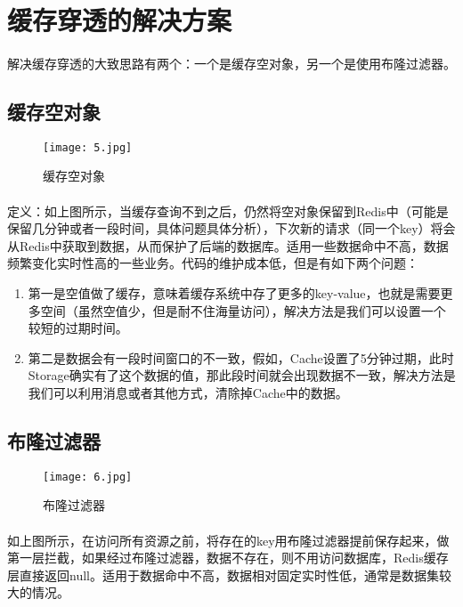 \documentclass[lang=cn,11pt,a4paper,cite=numbers]{elegantpaper}
\begin{document}
\section{缓存穿透的解决方案}
\paragraph{}解决缓存穿透的大致思路有两个：一个是缓存空对象，另一个是使用布隆过滤器。
\subsection{缓存空对象}
\begin{figure}[!htb]
    \centering
    \texttt{[image: 5.jpg]}
    \caption{缓存空对象}
\end{figure}
\paragraph{}定义：如上图所示，当缓存查询不到之后，仍然将空对象保留到Redis中（可能是保留几分钟或者一段时间，具体问题具体分析），下次新的请求（同一个key）将会从Redis中获取到数据，从而保护了后端的数据库。适用一些数据命中不高，数据频繁变化实时性高的一些业务。代码的维护成本低，但是有如下两个问题：
\begin{enumerate}
    \item 第一是空值做了缓存，意味着缓存系统中存了更多的key-value，也就是需要更多空间（虽然空值少，但是耐不住海量访问），解决方法是我们可以设置一个较短的过期时间。
    \item 第二是数据会有一段时间窗口的不一致，假如，Cache设置了5分钟过期，此时Storage确实有了这个数据的值，那此段时间就会出现数据不一致，解决方法是我们可以利用消息或者其他方式，清除掉Cache中的数据。
  \end{enumerate}
\subsection{布隆过滤器}
\begin{figure}[!htb]
    \centering
    \texttt{[image: 6.jpg]}
    \caption{布隆过滤器}
\end{figure}
\paragraph{}如上图所示，在访问所有资源之前，将存在的key用布隆过滤器提前保存起来，做第一层拦截，如果经过布隆过滤器，数据不存在，则不用访问数据库，Redis缓存层直接返回null。适用于数据命中不高，数据相对固定实时性低，通常是数据集较大的情况。
\end{document}
